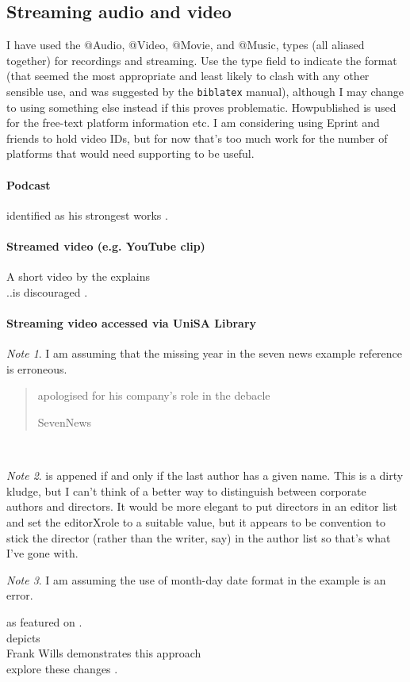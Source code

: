 \documentclass[a4paper,australian,oneside,12pt,footlines=3]{scrbook}%
\newcommand{\todo}[1]{\marginpar{\singlespacing\textbf{TO DO:} {#1}}}
\newcommand{\biblatex}{\texttt{biblatex}}
\theoremstyle{remark}
\newtheorem*{note}{Note}
\begin{document}
\begin{refsection}
\section{Streaming audio and video}
I have used the @Audio, @Video, @Movie, and @Music, types (all aliased together) for recordings and streaming. Use the type field to indicate the format (that seemed the most appropriate and least likely to clash with any other sensible use, and was suggested by the \biblatex{} manual), although I may change to using something else instead if this proves problematic. Howpublished is used for the free-text platform information etc. I am considering using Eprint and friends to hold video IDs, but for now that's too much work for the number of platforms that would need supporting to be useful.

\paragraph{Podcast}
\textelp{}identified as his strongest works \parencite{Hitfix}.

\paragraph{Streamed video (e.g. YouTube clip)}
A short video by the \textcite{UOML2015} explains\textelp{}\\
..is discouraged \parencite{UOML2015}.

\paragraph{Streaming video accessed via UniSA Library}
\begin{note}
I am assuming that the missing year in the seven news example reference is erroneous.\todo{Confirm this.}
\end{note}
\textelp{}\blockquote[SevenNews]{apologised for his company’s role in the debacle}\\
\begin{note}
 is appened if and only if the last author has a given name. This is a dirty kludge, but I can't think of a better way to distinguish between corporate authors and directors.
It would be more elegant to put directors in an editor list and set the editorXrole to a suitable value, but it appears to be convention to stick the director (rather than the writer, say) in the author list so that's what I've gone with.
\end{note}
\begin{note}
I am assuming the use of month-day date format in the example is an error.
\end{note}
\textelp{}\textelp{}as featured on \textcite{Checkout}.\\
\textcite{Django} depicts\textelp{}\\
Frank Wills \parencite{Simmons2010} demonstrates this approach\textelp{}\\
\textelp{}explore these changes \parencite{Visconti1963}.
\printbibliography[heading=subbibliography]
\end{refsection}
\end{document}
